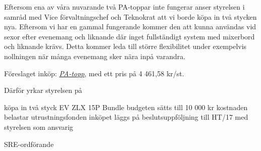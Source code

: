 \documentclass[../_main/handlingar.tex]{subfiles}
\def\sreordf{Pontus Landgren}
\begin{document}

Eftersom ena av våra nuvarande två PA-toppar inte fungerar anser styrelsen i samråd med Vice förvaltningschef och Teknokrat att vi borde köpa in två stycken nya. Eftersom vi har en gammal fungerande kommer den att kunna användas vid sexor efter evenemang och liknande där inget fullständigt system med mixerbord och liknande krävs. Detta kommer leda till större flexibilitet under exempelvis nollningen när många evenemang sker nära inpå varandra. 

Föreslaget inköp: \href{https://www.thomann.de/se/ev_zlx_15p_bundle_2.htm?ref=search_rslt_EV+ZLX+15P_340452_2}{\textit{PA-topp}}, med ett pris på 4 461,58 kr/st.


Därför yrkar styrelsen på

\begin{attsatser}
    \att köpa in två styck EV ZLX 15P Bundle
    \att budgeten sätts till 10 000 kr 
    \att kostnaden belastar utrustningsfonden
    \att inköpet läggs på beslutsuppföljning till HT/17 med styrelsen som ansvarig 
    
\end{attsatser}

\begin{signatures}{1}
    \ist
    \signature{\sreordf}{SRE-ordförande}
\end{signatures}
\end{document}
